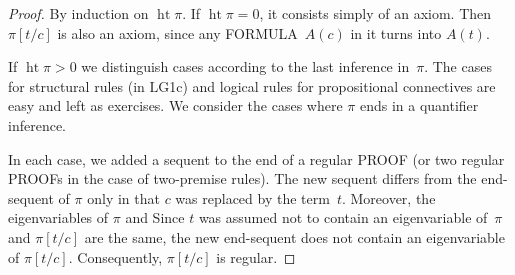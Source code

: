 \documentclass[10pt,a4paper]{article}
\newcommand*{\olup}[1]{\MakeUppercase{#1}}
\theoremstyle{plain}
\theoremstyle{definition}
\theoremstyle{remark}
\providecommand{\AxiomC}[1]{}
\providecommand{\RightLabel}[1]{}
\providecommand{\DisplayProof}{}
\providecommand{\fCenter}{}
\providecommand{\lforall}{\mathord{\forall}}
\providecommand{\lexists}{\mathord{\exists}}
\providecommand{\Subst}[3]{#1[#2/#3]}
\providecommand{\Log}{\ensuremath{\mathrm{L}}}
\providecommand{\LeftR}[1]{}
\providecommand{\RightR}[1]{}
\providecommand{\Deduce}{\mathrm{D}}
\providecommand{\UnaryInf}{\ensuremath{\mid}}
\providecommand{\pheight}{\operatorname{ht}}
\providecommand{\RightR}{\mathrm{R}}
\providecommand{\LeftR}{\mathrm{L}}
\begin{document}
\begin{proof}
  By induction on $\pheight{\pi}$. If $\pheight{\pi} = 0$, it consists
  simply of an axiom. Then $\Subst{\pi}{t}{c}$ is also an axiom, since
  any \olup{formula}~$A(c)$ in it turns into $A(t)$.

  If $\pheight{\pi} > 0$ we distinguish cases according to the last
  inference in~$\pi$. The cases for structural rules (in \Log{G1c})
  and logical rules for propositional connectives are easy and left as
  exercises. We consider the cases where $\pi$ ends in a quantifier
  inference.
  In each case, we added a sequent to the end of a regular \olup{proof}
  (or two regular \olup{proof}s in the case of two-premise rules). The
  new sequent differs from the end-sequent of $\pi$ only in that $c$
  was replaced by the term~$t$. Moreover, the eigenvariables of $\pi$
  and Since $t$ was assumed not to contain an eigenvariable of~$\pi$
  and $\Subst{\pi}{t}{c}$ are the same, the new end-sequent does not
  contain an eigenvariable of $\Subst{\pi}{t}{c}$. Consequently,
  $\Subst{\pi}{t}{c}$ is regular.
\end{proof}
\end{document}
